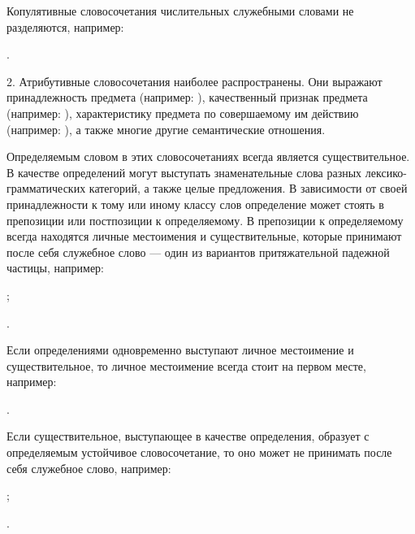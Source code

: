 Копулятивные словосочетания числительных служебными словами не разделяются, например:
\begin{prfsample}
	\item {}.
\end{prfsample}

2. Атрибутивные словосочетания наиболее распространены. Они выражают принадлежность предмета (например: ),
качественный признак предмета (например: ),
характеристику предмета по совершаемому им действию (например: ), а также многие другие семантические отношения.

Определяемым словом в этих словосочетаниях всегда является существительное. В качестве определений могут выступать знаменательные слова разных лексико-грамматических категорий, а также целые предложения. В зависимости от своей принадлежности к тому или иному классу слов определение может стоять в препозиции или постпозиции к определяемому. В препозиции к определяемому всегда находятся личные местоимения и существительные, которые принимают после себя служебное слово --- один из вариантов притяжательной падежной частицы, например:
\begin{prfsample}
	\item {};
	\item {}.	
\end{prfsample}
Если определениями одновременно выступают личное местоимение и существительное, то личное местоимение всегда стоит на первом месте, например:
\begin{prfsample}
	\item {}.	
\end{prfsample}
Если существительное, выступающее в качестве определения, образует с определяемым устойчивое словосочетание, то оно может не принимать после себя служебное слово, например:
\begin{prfsample}
	\item {};
	\item {}.
\end{prfsample}


